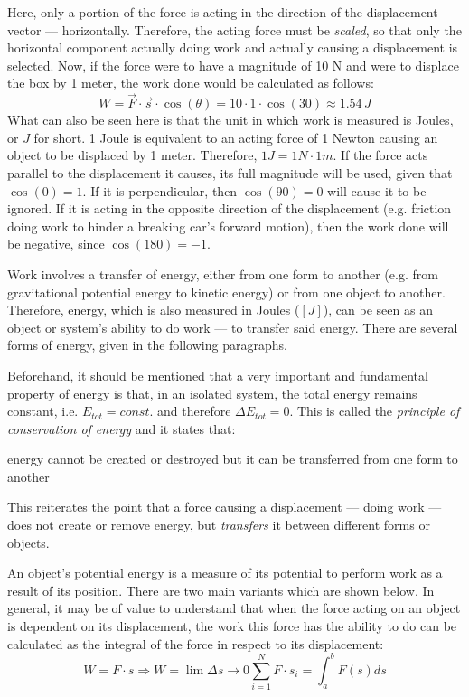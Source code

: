 Here, only a portion of the force is acting in the direction of the displacement vector --- horizontally. Therefore, the acting force must be \emph{scaled}, so that only the horizontal component actually doing work and actually causing a displacement is selected. Now, if the force were to have a magnitude of 10 N and were to displace the box by 1 meter, the work done would be calculated as follows: $$W = \vec{F} \cdot \vec{s} \cdot \cos(\theta) = 10 \cdot 1 \cdot \cos(30) \approx 1.54 \, J$$ What can also be seen here is that the unit in which work is measured is Joules, or $J$ for short. 1 Joule is equivalent to an acting force of 1 Newton causing an object to be displaced by 1 meter. Therefore, $1 J = 1 N \cdot 1 m$. If the force acts parallel to the displacement it causes, its full magnitude will be used, given that $\cos(0) = 1$. If it is perpendicular, then $\cos(90) = 0$ will cause it to be ignored. If it is acting in the opposite direction of the displacement (e.g. friction doing work to hinder a breaking car's forward motion), then the work done will be negative, since $\cos(180) = -1$. 

\pagebreak


Work involves a transfer of energy, either from one form to another (e.g. from gravitational potential energy to kinetic energy) or from one object to another. Therefore, energy, which is also measured in Joules ($[J]$), can be seen as an object or system's ability to do work --- to transfer said energy. There are several forms of energy, given in the following paragraphs.

Beforehand, it should be mentioned that a very important and fundamental property of energy is that, in an isolated system, the total energy remains constant, i.e. $E_{tot} = const.$ and therefore $\Delta E_{tot} = 0$. This is called the \emph{principle of conservation of energy} and it states that:

\begin{displayquote}
	energy cannot be created or destroyed but it can be transferred from one form to another
\end{displayquote}

This reiterates the point that a force causing a displacement --- doing work --- does not create or remove energy, but \emph{transfers} it between different forms or objects.


An object's potential energy is a measure of its potential to perform work as a result of its position. There are two main variants which are shown below. In general, it may be of value to understand that when the force acting on an object is dependent on its displacement, the work this force has the ability to do can be calculated as the integral of the force in respect to its displacement: $$W = F \cdot s \Rightarrow W = \lim{\Delta s \rightarrow 0} \sum_{i=1}^{N} F \cdot s_i = \int_{a}^{b} F(s) ds$$

